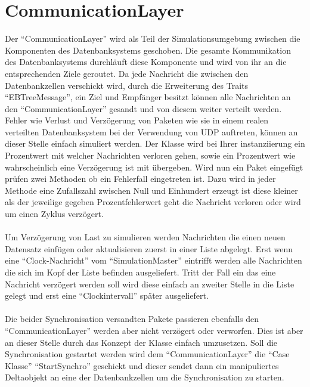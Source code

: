\documentclass[a4paper,11pt,oneside,%
headsepline,												%
footsepline,												%
bibtotocnumbered									%
]{scrreprt}
\begin{document}
\section{CommunicationLayer}
Der \enquote{CommunicationLayer} wird als Teil der Simulationsumgebung zwischen die Komponenten des Datenbanksystems geschoben. Die gesamte Kommunikation des Datenbanksystems durchläuft diese Komponente und wird von ihr an die entsprechenden Ziele geroutet. Da jede Nachricht die zwischen den Datenbankzellen verschickt wird, durch die Erweiterung des Traits \enquote{EBTreeMessage}, ein Ziel und Empfänger besitzt können alle Nachrichten an den \enquote{CommunicationLayer} gesandt  und von diesem weiter verteilt werden. Fehler wie Verlust und Verzögerung von Paketen wie sie in einem realen verteilten Datenbanksystem bei der Verwendung von UDP auftreten, können an dieser Stelle einfach simuliert werden. Der Klasse wird bei Ihrer instanziierung ein Prozentwert mit welcher Nachrichten verloren gehen, sowie ein Prozentwert wie wahrscheinlich eine Verzögerung ist mit übergeben. Wird nun ein Paket eingefügt prüfen zwei Methoden ob ein Fehlerfall eingetreten ist. Dazu wird in jeder Methode eine Zufallszahl zwischen Null und Einhundert erzeugt ist diese kleiner als der jeweilige gegeben Prozentfehlerwert geht die Nachricht verloren oder wird um einen Zyklus verzögert.\\\\
Um Verzögerung von Last zu simulieren werden Nachrichten die einen neuen Datensatz einfügen oder aktualisieren zuerst in einer Liste abgelegt. Erst wenn eine \enquote{Clock-Nachricht} vom \enquote{SimulationMaster} eintrifft werden alle Nachrichten die sich im Kopf der Liste befinden ausgeliefert. Tritt der Fall ein das eine Nachricht verzögert werden soll wird diese einfach an zweiter Stelle in die Liste gelegt und erst eine \enquote{Clockintervall} später ausgeliefert.\\\\
Die beider Synchronisation versandten Pakete passieren ebenfalls den \enquote{CommunicationLayer} werden aber nicht verzögert oder verworfen. Dies ist aber an dieser Stelle durch das Konzept der Klasse einfach umzusetzen. Soll die Synchronisation gestartet werden wird dem \enquote{CommunicationLayer} die \enquote{Case Klasse} \enquote{StartSynchro} geschickt und dieser sendet dann ein manipuliertes Deltaobjekt an eine der Datenbankzellen um die Synchronisation zu starten.
\end{document}
